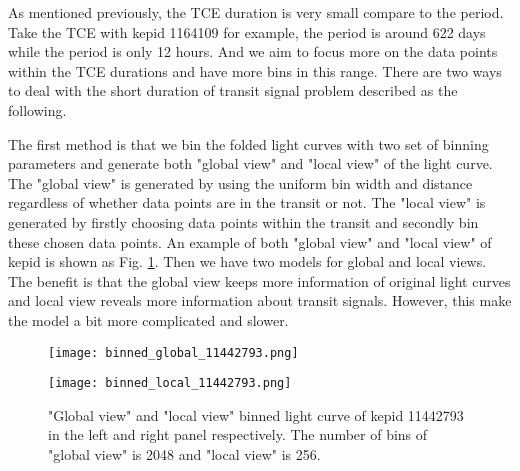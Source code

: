       As mentioned previously, the TCE duration is very small compare to the period. 
      Take the TCE with kepid 1164109 for example, the period is around 622 days while 
      the period is only 12 hours. And we aim to focus more on the data points within 
      the TCE durations and have more bins in this range. There are two ways to deal with 
      the short duration of transit signal problem described as the following.

      The first method is that we bin the folded light curves with two set of binning 
      parameters and generate
      both "global view" and "local view" of the light curve. \cite{Shallue_2018} The 
      "global view" is generated by using the uniform bin width and distance regardless 
      of whether data points are in the transit or not. The "local view" is generated by 
      firstly choosing data points within the transit and secondly bin these chosen data 
      points. An example of both "global view" and "local view" of kepid is shown as Fig. 
      \ref{fig: global_local_11442793}. Then we have two models for global and local 
      views. The benefit is that the global view keeps more information of original 
      light curves and local view reveals more information about transit signals. However, 
      this make the model a bit more complicated and slower.

      \begin{figure}[!ht]  
        \begin{center}
        \begin{minipage}{0.45\textwidth}
          \begin{center} 
              \texttt{[image: binned\_global\_11442793.png]}
          \end{center}
        \end{minipage}
        \begin{minipage}{0.45\textwidth}
          \begin{center} 
              \texttt{[image: binned\_local\_11442793.png]}
          \end{center}
        \end{minipage}
      \end{center}
      \begin{center}
        \caption["Global view" and "local view" binned light curve of kepid 11442793.]
          {"Global view" and "local view" binned light curve of kepid 11442793 in the 
          left and right panel respectively. The number of bins of "global view" is 
          2048 and "local view" is 256.}
        \label{fig: global_local_11442793}
        \end{center}
      \end{figure}
    
